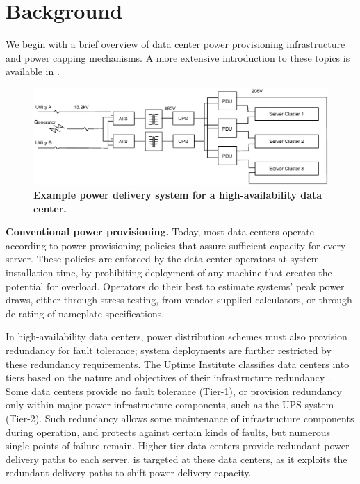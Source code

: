 \section{Background}
\label{section::background}

We begin with a brief overview of data center power provisioning infrastructure and power capping mechanisms.  A more extensive introduction to these topics is available in \cite{BarrosoBook09}.

\begin{figure}[t]
\centering
\includegraphics[scale=.5]{Appendices/PowerRouting/figure/redundant.eps}
\vspace{-0.15 in}
\caption{ \textbf{Example power delivery system for a high-availability data center.} }
\vspace{-0.15 in}
\label{figure::redundant}
\end{figure}


\textbf{Conventional power provisioning.} Today, most data centers operate according to power provisioning policies that assure sufficient capacity for every server. These policies are enforced by the data center operators at system installation time, by prohibiting deployment of any machine that creates the potential for overload.  Operators do their best to estimate systems' peak power draws, either through stress-testing, from vendor-supplied calculators, or through de-rating of nameplate specifications.

In high-availability data centers, power distribution schemes must also provision redundancy for fault tolerance; system deployments are further restricted by these redundancy requirements.  The Uptime Institute classifies data centers into tiers based on the nature and objectives of their infrastructure redundancy \cite{Turner05}. Some data centers provide no fault tolerance (Tier-1), or provision redundancy only within major power infrastructure components, such as the UPS system (Tier-2).  Such redundancy allows some maintenance of infrastructure components during operation, and protects against certain kinds of faults, but numerous single points-of-failure remain.  Higher-tier data centers provide redundant power delivery paths to each server. \PowerRouting is targeted at these data centers, as it exploits the redundant delivery paths to shift power delivery capacity.

